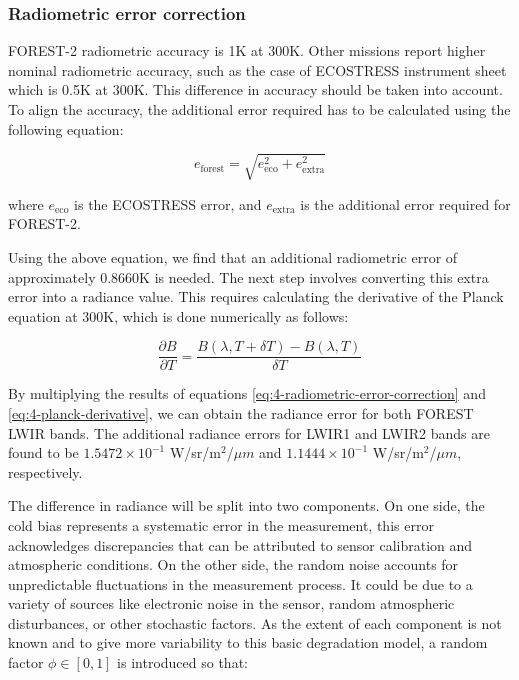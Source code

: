        \subsubsection{Radiometric error correction}

        FOREST-2 radiometric accuracy is 1K at 300K.
        Other missions report higher nominal radiometric accuracy, such as the case of ECOSTRESS instrument sheet \cite{ECOSTRESS2023INSTRUMENT} which is 0.5K at 300K.
        This difference in accuracy should be taken into account. To align the accuracy, the additional error required has to be calculated using the following equation:

        \begin{equation}
            e_{\text{forest}} = \sqrt{e_{\text{eco}}^2 + e_{\text{extra}}^2} 
            \label{eq:4-radiometric-error-correction}
        \end{equation}
        
        where $e_{\text{eco}}$ is the ECOSTRESS error, and $ e_{\text{extra}}$ is the additional error required for FOREST-2.
        
        Using the above equation, we find that an additional radiometric error of approximately 0.8660K is needed. The next step involves converting this extra error into a radiance value. This requires calculating the derivative of the Planck equation at 300K, which is done numerically as follows:
        
        \begin{equation}
            \frac{\partial B}{\partial T} = \frac{B(\lambda, T + \delta T) - B(\lambda, T)}{\delta T}
            \label{eq:4-planck-derivative}
        \end{equation}  
        
        By multiplying the results of equations \ref{eq:4-radiometric-error-correction} and \ref{eq:4-planck-derivative}, we can obtain the radiance error for both FOREST LWIR bands. The additional radiance errors for LWIR1 and LWIR2 bands are found to be \(1.5472 \times 10^{-1}\) W/sr/m\(^2\)/\(\mu m\) and \(1.1444 \times 10^{-1}\) W/sr/m\(^2\)/\(\mu m\), respectively.

        The difference in radiance will be split into two components. On one side, the cold bias represents a systematic error in the measurement, this error acknowledges discrepancies that can be attributed to sensor calibration and atmospheric conditions. On the other side, the random noise accounts for unpredictable fluctuations in the measurement process. It could be due to a variety of sources like electronic noise in the sensor, random atmospheric disturbances, or other stochastic factors. As the extent of each component is not known and to give more variability to this basic degradation model, a random factor $\phi \in [0,1] $ is introduced so that:

